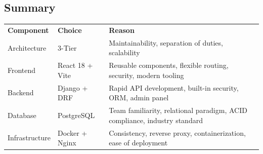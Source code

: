 \subsection*{Summary}

\begin{tabular}{L{2.6cm} L{3.4cm} L{7.4cm}}
  \color{white}\bfseries Component &
  \color{white}\bfseries Choice &
  \color{white}\bfseries Reason \\
  Architecture & 3-Tier & Maintainability, separation of duties, scalability \\
  Frontend & React 18 + Vite & Reusable components, flexible routing, security, modern tooling \\
  Backend & Django + DRF & Rapid API development, built-in security, ORM, admin panel \\
  Database & PostgreSQL & Team familiarity, relational paradigm, ACID compliance, industry standard \\
  Infrastructure & Docker + Nginx & Consistency, reverse proxy, containerization, ease of deployment \\
\end{tabular}